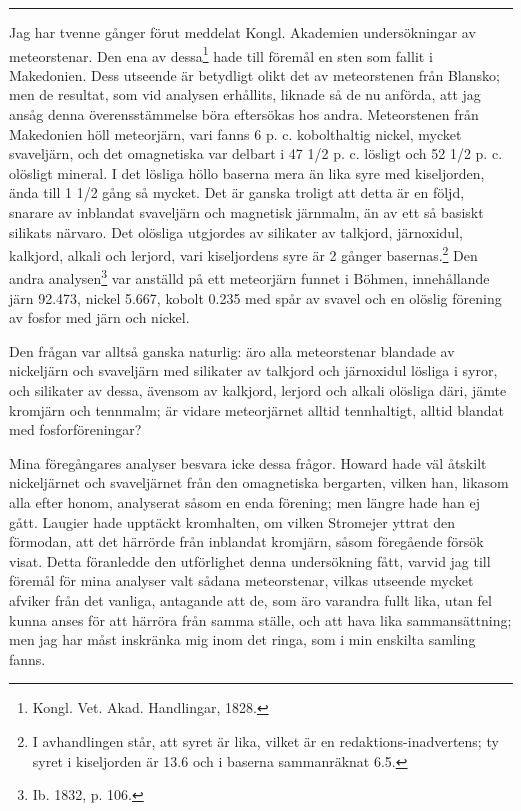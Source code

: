 \documentclass[a4paper, 12pt, oneside, swedish]{article}
\begin{document}
\noindent\rule{\textwidth}{1pt}

Jag har tvenne gånger förut meddelat Kongl. Akademien undersökningar av meteorstenar. Den ena av dessa\footnote{Kongl. Vet. Akad. Handlingar, 1828.} hade till föremål en sten som fallit i Makedonien. Dess utseende är betydligt olikt det av meteorstenen från Blansko; men de resultat, som vid analysen erhållits, liknade så de nu anförda, att jag ansåg denna överensstämmelse böra eftersökas hos andra. Meteorstenen från Makedonien höll meteorjärn, vari fanns 6 p. c. kobolthaltig nickel, mycket svaveljärn, och det omagnetiska var delbart i 47 1/2 p. c. lösligt och 52 1/2 p. c. olösligt mineral. I det lösliga höllo baserna mera än lika syre med kiseljorden, ända till 1 1/2 gång så mycket. Det är ganska troligt att detta är en följd, snarare av inblandat svaveljärn och magnetisk järnmalm, än av ett så basiskt silikats närvaro. Det olösliga utgjordes av silikater av talkjord, järnoxidul, kalkjord, alkali och lerjord, vari kiseljordens syre är 2 gånger basernas.\footnote{I avhandlingen står, att syret är lika, vilket är en redaktions-inadvertens; ty syret i kiseljorden är 13.6 och i baserna sammanräknat 6.5.} Den andra analysen\footnote{Ib. 1832, p. 106.} var anställd på ett meteorjärn funnet i Böhmen, innehållande järn 92.473, nickel 5.667, kobolt 0.235 med spår av svavel och en olöslig förening av fosfor med järn och nickel.

Den frågan var alltså ganska naturlig: äro alla meteorstenar blandade av nickeljärn och svaveljärn med silikater av talkjord och järnoxidul lösliga i syror, och silikater av dessa, ävensom av kalkjord, lerjord och alkali olösliga däri, jämte kromjärn och tennmalm; är vidare meteorjärnet alltid tennhaltigt, alltid blandat med fosforföreningar?

Mina föregångares analyser besvara icke dessa frågor. Howard hade väl åtskilt nickeljärnet och svaveljärnet från den omagnetiska bergarten, vilken han, likasom alla efter honom, analyserat såsom en enda förening; men längre hade han ej gått. Laugier hade upptäckt kromhalten, om vilken Stromejer yttrat den förmodan, att det härrörde från inblandat kromjärn, såsom föregående försök visat. Detta föranledde den utförlighet denna undersökning fått, varvid jag till föremål för mina analyser valt sådana meteorstenar, vilkas utseende mycket afviker från det vanliga, antagande att de, som äro varandra fullt lika, utan fel kunna anses för att härröra från samma ställe, och att hava lika sammansättning; men jag har måst inskränka mig inom det ringa, som i min enskilta samling fanns.
\clearpage
\end{document}
